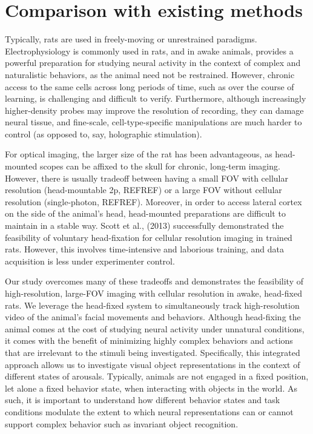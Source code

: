\section{Comparison with existing methods}
Typically, rats are used in freely-moving or unrestrained paradigms. Electrophysiology is commonly used in rats, and in awake animals, provides a powerful preparation for studying neural activity in the context of complex and naturalistic behaviors, as the animal need not be restrained. However, chronic access to the same cells across long periods of time, such as over the course of learning, is challenging and difficult to verify. Furthermore, although increasingly higher-density probes may improve the resolution of recording, they can damage neural tissue, and fine-scale, cell-type-specific manipulations are much harder to control (as opposed to, say, holographic stimulation).  

For optical imaging, the larger size of the rat has been advantageous, as head-mounted scopes can be affixed to the skull for chronic, long-term imaging. However, there is usually tradeoff between having a small FOV with cellular resolution (head-mountable 2p, REFREF) or a large FOV without cellular resolution (single-photon, REFREF). Moreover, in order to access lateral cortex on the side of the animal’s head, head-mounted preparations are difficult to maintain in a stable way. Scott et al., (2013) successfully demonstrated the feasibility of voluntary head-fixation for cellular resolution imaging in trained rats. However, this involves time-intensive and laborious training, and data acquisition is less under experimenter control. 

Our study overcomes many of these tradeoffs and demonstrates the feasibility of high-resolution, large-FOV imaging with cellular resolution in awake, head-fixed rats. We leverage the head-fixed system to simultaneously track high-resolution video of the animal’s facial movements and behaviors. Although head-fixing the animal comes at the cost of studying neural activity under unnatural conditions, it comes with the benefit of minimizing highly complex behaviors and actions that are irrelevant to the stimuli being investigated. Specifically, this integrated approach allows us to investigate visual object representations in the context of different states of arousals. Typically, animals are not engaged in a fixed position, let alone a fixed behavior state, when interacting with objects in the world. As such, it is important to understand how different behavior states and task conditions modulate the extent to which neural representations can or cannot support complex behavior such as invariant object recognition.


